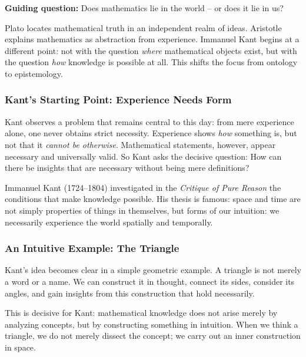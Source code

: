 \textbf{Guiding question:} Does mathematics lie in the world -- or does it lie in us?

\medskip

Plato locates mathematical truth
in an independent realm of ideas.
Aristotle explains mathematics
as abstraction from experience.
Immanuel Kant begins at a different point:
not with the question
\emph{where} mathematical objects exist,
but with the question
\emph{how} knowledge is possible at all.
This shifts the focus from ontology to epistemology.

\subsubsection*{Kant's Starting Point: Experience Needs Form}

Kant observes a problem
that remains central to this day:
from mere experience alone, one never obtains strict necessity.
Experience shows
\emph{how} something is,
but not
that it \emph{cannot be otherwise}.
Mathematical statements, however, appear necessary and universally valid.
So Kant asks the decisive question:
How can there be insights
that are necessary
without being mere definitions?

\begin{HistoryBox}
	\label{box:kant-cpr}
	\small
	Immanuel Kant (1724--1804) investigated in the
	\emph{Critique of Pure Reason}
	the conditions that make knowledge possible.
	His thesis is famous:
	space and time are not simply properties of things in themselves,
	but forms of our intuition:
	we necessarily experience the world spatially and temporally.
\end{HistoryBox}

\subsubsection*{An Intuitive Example: The Triangle}

Kant's idea becomes clear in a simple geometric example.
A triangle is not merely a word or a name.
We can construct it in thought,
connect its sides,
consider its angles,
and gain insights from this construction
that hold necessarily.

This is decisive for Kant:
mathematical knowledge does not arise merely
by analyzing concepts,
but by constructing something in intuition.
When we think a triangle,
we do not merely dissect the concept;
we carry out an inner construction in space.


